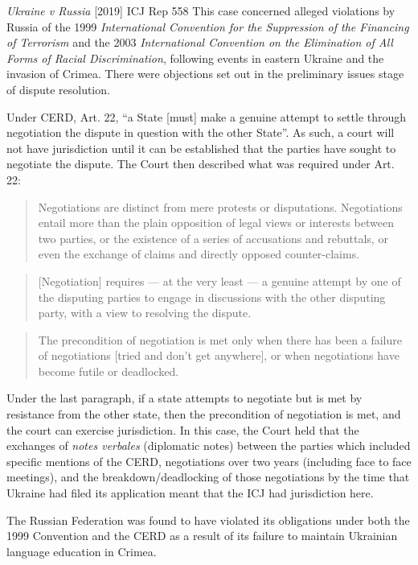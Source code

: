 \begin{casedetails}{\textit{Ukraine v Russia} [2019] ICJ Rep 558}
    \flushleft
    This case concerned alleged violations by Russia of the 1999 \textit{International Convention for the Suppression of the Financing of Terrorism} and the 2003 \textit{International Convention on the Elimination of All Forms of Racial Discrimination}, following events in eastern Ukraine and the invasion of Crimea. There were objections set out in the preliminary issues stage of dispute resolution.


    Under CERD, Art. 22, ``a State [must] make a genuine attempt to settle through negotiation the dispute in question with the other State''. As such, a court will not have jurisdiction until it can be established that the parties have sought to negotiate the dispute. The Court then described what was required under Art. 22:

    \begin{quote}
        Negotiations are distinct from mere protests or disputations. Negotiations entail more than the plain opposition of legal views or interests between two parties, or the existence of a series of accusations and rebuttals, or even the exchange of claims and directly opposed counter-claims.
    \end{quote}

    \begin{quote}
        [Negotiation] requires — at the very least — a genuine attempt by one of the disputing parties to engage in discussions with the other disputing party, with a view to resolving the dispute.
    \end{quote}

    \begin{quote}
        The precondition of negotiation is met only when there has been a failure of negotiations [tried and don't get anywhere], or when negotiations have become futile or deadlocked.
    \end{quote}

    Under the last paragraph, if a state attempts to negotiate but is met by resistance from the other state, then the precondition of negotiation is met, and the court can exercise jurisdiction. In this case, the Court held that the exchanges of \textit{notes verbales} (diplomatic notes) between the parties which included specific mentions of the CERD, negotiations over two years (including face to face meetings), and the breakdown/deadlocking of those negotiations by the time that Ukraine had filed its application meant that the ICJ had jurisdiction here.

    The Russian Federation was found to have violated its obligations under both the 1999 Convention and the CERD as a result of its failure to maintain Ukrainian language education in Crimea.
\end{casedetails}

